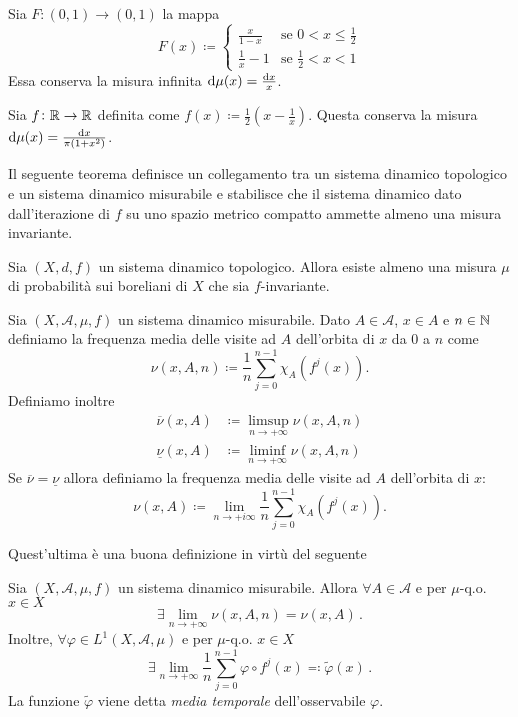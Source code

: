 \begin{exercise}
    Sia $ F\colon (0,1)\to (0,1) $ la mappa
    \[
        F(x) \coloneqq
        \begin{cases}
            \frac{x}{1-x}   & \text{se } 0 < x \leq \frac{1}{2} \\
            \frac{1}{x} - 1 & \text{se } \frac{1}{2} < x < 1
        \end{cases}
    \]
    Essa conserva la misura infinita $ \dif{\mu}(x) = \frac{\dif{x}}{x} $.
\end{exercise}

\begin{exercise}
    Sia $ f\colon \mathbb{R}\to\mathbb{R} $ definita come $ f(x) \coloneqq \frac{1}{2} \left( x - \frac{1}{x} \right) $. Questa conserva la misura $ \dif{\mu}(x) = \frac{\dif{x}}{\pi(1+x^2)} $.
\end{exercise}

Il seguente teorema definisce un collegamento tra un sistema dinamico topologico e un sistema dinamico misurabile e stabilisce che il sistema dinamico dato dall'iterazione di $ f $ su uno spazio metrico compatto ammette almeno una misura invariante. 

\begin{thm}
    Sia $ (X, d, f) $ un sistema dinamico topologico. Allora esiste almeno una misura $ \mu $ di probabilità sui boreliani di $ X $ che sia $ f $-invariante.
\end{thm}

\begin{definition}
    Sia $ (X, \mathcal{A}, \mu, f) $ un sistema dinamico misurabile. Dato $ A \in \mathcal{A} $, $ x \in A $ e $ n \in \mathbb{N} $ definiamo la frequenza media delle visite ad $ A $ dell'orbita di $ x $ da $ 0 $ a $ n $ come
    \[
        \nu(x, A, n) \coloneqq \frac{1}{n} \sum_{j = 0}^{n-1} \chi_A(f^{j}(x)).
    \]
    Definiamo inoltre
    \begin{align*}
        \overline{\nu}(x, A) & \coloneqq \limsup_{n \to +\infty} \nu(x, A, n) \\
        \underline{\nu}(x, A) & \coloneqq \liminf_{n \to +\infty} \nu(x, A, n)
    \end{align*}
    Se $ \overline{\nu} = \underline{\nu} $ allora definiamo la frequenza media delle visite ad $ A $ dell'orbita di $ x $:
    \[
        \nu(x, A) \coloneqq \lim_{n \to +i\infty} \frac{1}{n} \sum_{j = 0}^{n-1} \chi_A(f^{j}(x)).
    \]
\end{definition}
Quest'ultima è una buona definizione in virtù del seguente
\begin{thm}[Birkhoff]
    Sia $ (X,\mathcal{A},\mu,f) $ un sistema dinamico misurabile. Allora $ \forall A\in\mathcal{A} $ e per $ \mu $-q.o. $ x\in X $
    \[ \exists \lim_{n \to +\infty} \nu(x,A,n) = \nu(x,A) \, . \]
    Inoltre, $ \forall \varphi \in L^1(X,\mathcal{A},\mu) $ e per $ \mu $-q.o. $ x\in X $
    \[ \exists \lim_{n \to +\infty} \frac{1}{n} \sum_{j=0}^{n-1} \varphi\circ f^j(x) \eqqcolon \tilde{\varphi}(x) \, . \]
    La funzione $ \tilde{\varphi} $ viene detta \emph{media temporale} dell'osservabile $ \varphi $.
\end{thm}

